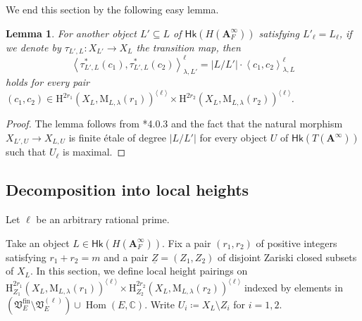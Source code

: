 \documentclass[12pt]{amsart}
\numberwithin{equation}{section}
\theoremstyle{plain}
\newtheorem{lem}[proposition]{Lemma}
\theoremstyle{definition}
\theoremstyle{remark}
\renewcommand{\b}[1]{\mathbf{#1}}
\renewcommand{\d}[1]{\mathbb{#1}}
\newcommand{\f}[1]{\mathfrak{#1}}
\renewcommand{\r}[1]{\mathrm{#1}}
\renewcommand{\sf}[1]{\mathsf{#1}}
\renewcommand{\(}{\left(}
\renewcommand{\)}{\right)}
\newcommand{\ang}[1]{\langle{#1}\rangle}
\newcommand{\ul}{\underline}
\newcommand{\bA}{\b A}
\newcommand{\dC}{\d C}
\newcommand{\fV}{\f V}
\newcommand{\rH}{\r H}
\newcommand{\rM}{\r M}
\newcommand{\llangle}{\left\langle}
\newcommand{\rrangle}{\right\rangle}
\newcommand{\fin}{\r{fin}}
\newcommand{\Hk}{\sf{Hk}}
\DeclareMathOperator{\Hom}{Hom}
\begin{document}
We end this section by the following easy lemma.

\begin{lem}\label{le:height_pairing_level}
For another object $L'\subseteq L$ of $\Hk(H(\bA_F^\infty))$ satisfying $L'_\ell=L_\ell$, if we denote by $\tau_{L',L}\colon X_{L'}\to X_L$ the transition map, then
\[
\llangle\tau_{L',L}^*(c_1),\tau_{L',L}^*(c_2)\rrangle_{\lambda,L'}^{\ell}
=|L/L'|\cdot\llangle c_1,c_2\rrangle_{\lambda,L}^{\ell}
\]
holds for every pair $(c_1,c_2)\in\rH^{2r_1}(X_L,\rM_{L,\lambda}(r_1))^{\ang\ell}\times\rH^{2r_2}(X_L,\rM_{L,\lambda}(r_2))^{\ang\ell}$.
\end{lem}

\begin{proof}
The lemma follows from \cite{Bei87}*{4.0.3} and the fact that the natural morphism $X_{L',U}\to X_{L,U}$ is finite \'{e}tale of degree $|L/L'|$ for every object $U$ of $\Hk(T(\bA^\infty))$ such that $U_\ell$ is maximal.
\end{proof}





\subsection{Decomposition into local heights}
\label{ss:height_decomposition}

Let $\ell$ be an arbitrary rational prime.

Take an object $L\in\Hk(H(\bA_F^\infty))$. Fix a pair $(r_1,r_2)$ of positive integers satisfying $r_1+r_2=m$ and a pair $\ul{Z}=(Z_1,Z_2)$ of disjoint Zariski closed subsets of $X_L$. In this section, we define local height pairings on $\rH^{2r_1}_{Z_1}(X_L,\rM_{L,\lambda}(r_1))^{\ang\ell}\times\rH^{2r_2}_{Z_2}(X_L,\rM_{L,\lambda}(r_2))^{\ang\ell}$ indexed by elements in $(\fV_E^\fin\setminus\fV_E^{(\ell)})\cup\Hom(E,\dC)$. Write $U_i\coloneqq X_L\setminus Z_i$ for $i=1,2$.
\end{document}
